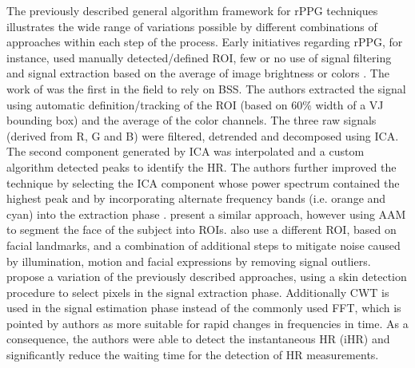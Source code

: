 The previously described general algorithm framework for rPPG techniques illustrates the wide range of variations possible by different combinations of approaches within each step of the process. Early initiatives regarding rPPG, for instance, used manually detected/defined ROI, few or no use of signal filtering and signal extraction based on the average of image brightness \parencite{takano2007heart} or colors \parencite{verkruysse2008remote}.
The work of \textcite{poh2010non} was the first in the field to rely on BSS. The authors extracted the signal using automatic definition/tracking of the ROI (based on 60\% width of a VJ bounding box) and the average of the color channels. The three raw signals (derived from R, G and B) were filtered, detrended and decomposed using ICA. The second component generated by ICA was interpolated and a custom algorithm detected peaks to identify the HR. The authors further improved the technique by selecting the ICA component whose power spectrum contained the highest peak \parencite{poh2011advancements} and by incorporating alternate frequency bands (i.e. orange and cyan) into the extraction phase \parencite{mcduff2014improvements}.
\textcite{Datcu_2013} present a similar approach, however using AAM to segment the face of the subject into ROIs. \textcite{li2014remote} also use a different ROI, based on facial landmarks, and a combination of additional steps to mitigate noise caused by illumination, motion and facial expressions by removing signal outliers. \textcite{bousefsaf2013continuous} propose a variation of the previously described approaches, using a skin detection procedure to select pixels in the signal extraction phase. Additionally CWT is used in the signal estimation phase instead of the commonly used FFT, which is pointed by authors as more suitable for rapid changes in frequencies in time. As a consequence, the authors were able to detect the instantaneous HR (iHR) and significantly reduce the waiting time for the detection of HR measurements.

